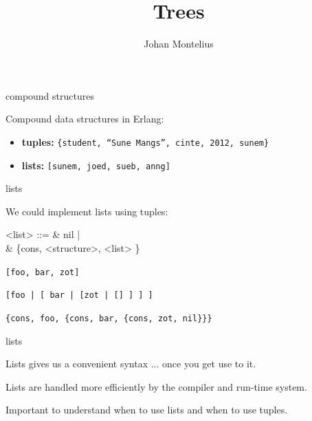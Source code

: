 

\title[ID1019 Trees]{Trees}


\author{Johan Montelius}
\date{\semester}



\begin{frame}
\titlepage
\end{frame}

\begin{frame}{compound structures}

Compound data structures in Erlang:

\begin{itemize}
 \item {\bf tuples:} {\tt \{student, ``Sune Mangs'', cinte, 2012,  sunem\}}
 \item {\bf lists:} {\tt [sunem, joed, sueb, anng]}
\end{itemize}
\end{frame}


\begin{frame}{lists}

We could implement lists using tuples:

\pause

\begin{code}
   <list> ::=  & nil | \\
               & \{cons, <structure>, <list> \}
\end{code}


\pause \vspace{20pt}
{\tt [foo, bar, zot]}

\pause \vspace{10pt}
{\tt [foo | [ bar | [zot | [] ] ] ] }

\pause \vspace{10pt}
{\tt \{cons, foo, \{cons, bar, \{cons, zot, nil\}\}\}}

\end{frame}


\begin{frame}{lists}

\pause Lists gives us a convenient syntax ... \pause once you get use to it.
\vspace{20pt}

\pause Lists are handled more efficiently by the compiler and run-time system.

\vspace{20pt}
\pause Important to understand when to use lists and when to use tuples.

\end{frame}

